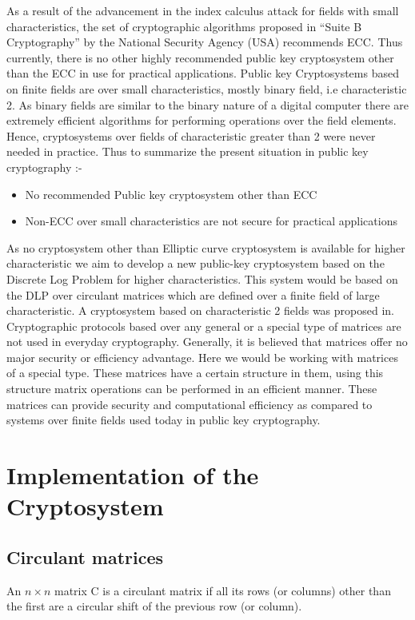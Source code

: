 As a result of the advancement in the index calculus attack for fields with small characteristics, the set of cryptographic algorithms
proposed in ``Suite B Cryptography''  by the National Security Agency (USA) recommends ECC.
Thus currently, there is no other highly recommended public key cryptosystem other than the ECC in use for practical applications.
Public key Cryptosystems based on finite fields are over small characteristics, mostly binary field, i.e characteristic 2.
As binary fields are similar to the binary nature of a digital computer there are extremely efficient algorithms for 
performing operations over the field elements. 
Hence, cryptosystems over fields of characteristic greater than 2 were never needed in practice.\newline
Thus to summarize the present situation in public key cryptography :-

\begin{itemize}
  \item No recommended Public key cryptosystem other than ECC
  \item Non-ECC over small characteristics are not secure for practical applications
\end{itemize}

As no cryptosystem other than Elliptic curve cryptosystem is available for higher characteristic we aim to develop a new public-key
cryptosystem based on the Discrete Log Problem for higher characteristics.
This system would be based on the DLP over circulant matrices which are defined over a finite field of large characteristic.
A cryptosystem based on characteristic 2 fields was proposed in.
Cryptographic protocols based over any general or a special type of matrices are not used in everyday cryptography.
Generally, it is believed that matrices offer no major security or efficiency advantage.
Here we would be working with matrices of a special type.
These matrices have a certain structure in them, using this structure matrix operations can be performed in an efficient manner.
These matrices can provide security and computational efficiency as compared to systems over finite fields used today in public key cryptography.

\section[ic]{Implementation of the Cryptosystem}

\subsection{Circulant matrices}
An $n \times n$ matrix C is a circulant matrix if all its rows (or columns) other than the first are a circular shift of the previous
row (or column).

